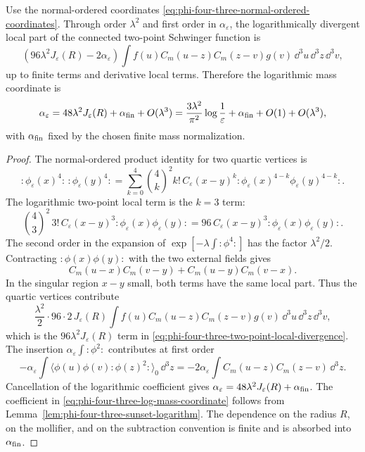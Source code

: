 \begin{lemma}
\label{lem:phi-four-three-two-loop-mass-coordinate}
Use the normal-ordered coordinates
\eqref{eq:phi-four-three-normal-ordered-coordinates}.  Through order
\(\lambda^2\) and first order in \(\alpha_\varepsilon\), the logarithmically
divergent local part of the connected two-point Schwinger function is
\begin{equation}
  \left(96\lambda^2J_\varepsilon(R)-2\alpha_\varepsilon\right)
  \int f(u)C_m(u-z)C_m(z-v)g(v)\,
  \dd^3u\,\dd^3z\,\dd^3v ,
  \label{eq:phi-four-three-two-point-local-divergence}
\end{equation}
up to finite terms and derivative local terms.  Therefore the logarithmic
mass coordinate is
\begin{equation}
  \alpha_\varepsilon
  =
  48\lambda^2J_\varepsilon(R)+\alpha_{\rm fin}+O(\lambda^3)
  =
  \frac{3\lambda^2}{\pi^2}\log\frac1\varepsilon
  +\alpha_{\rm fin}+O(1)+O(\lambda^3),
  \label{eq:phi-four-three-log-mass-coordinate}
\end{equation}
with \(\alpha_{\rm fin}\) fixed by the chosen finite mass normalization.
\end{lemma}

\begin{proof}
The normal-ordered product identity for two quartic vertices is
\begin{equation}
  :\!\phi_\varepsilon(x)^4\!:\,:\!\phi_\varepsilon(y)^4\!:
  =
  \sum_{k=0}^{4}
  \binom{4}{k}^2 k!\,
  C_\varepsilon(x-y)^k
  :\!\phi_\varepsilon(x)^{4-k}
  \phi_\varepsilon(y)^{4-k}\!: .
  \label{eq:phi-four-three-wick-product-two-vertices}
\end{equation}
The logarithmic two-point local term is the \(k=3\) term:
\[
  \binom{4}{3}^2\,3!\,C_\varepsilon(x-y)^3
  :\!\phi_\varepsilon(x)\phi_\varepsilon(y)\!:
  =
  96\,C_\varepsilon(x-y)^3
  :\!\phi_\varepsilon(x)\phi_\varepsilon(y)\!: .
\]
The second order in the expansion of
\(\exp[-\lambda\int:\phi^4:]\) has the factor \(\lambda^2/2\).  Contracting
\(:\!\phi(x)\phi(y)\!:\) with the two external fields gives
\[
  C_m(u-x)C_m(v-y)+C_m(u-y)C_m(v-x).
\]
In the singular region \(x-y\) small, both terms have the same local part.
Thus the quartic vertices contribute
\[
  \frac{\lambda^2}{2}\cdot 96\cdot 2\,J_\varepsilon(R)
  \int f(u)C_m(u-z)C_m(z-v)g(v)\,\dd^3u\,\dd^3z\,\dd^3v ,
\]
which is the \(96\lambda^2J_\varepsilon(R)\) term in
\eqref{eq:phi-four-three-two-point-local-divergence}.  The insertion
\(\alpha_\varepsilon\int:\phi^2:\) contributes at first order
\[
  -\alpha_\varepsilon
  \int \langle\phi(u)\phi(v):\!\phi(z)^2\!:\rangle_0
  \,\dd^3z
  =
  -2\alpha_\varepsilon
  \int C_m(u-z)C_m(z-v)\,\dd^3z .
  \]
Cancellation of the logarithmic coefficient gives
\(\alpha_\varepsilon=48\lambda^2J_\varepsilon(R)+\alpha_{\rm fin}\).  The
coefficient in \eqref{eq:phi-four-three-log-mass-coordinate} follows from
Lemma~\ref{lem:phi-four-three-sunset-logarithm}.  The dependence on the
radius \(R\), on the mollifier, and on the subtraction convention is finite
and is absorbed into \(\alpha_{\rm fin}\).
\end{proof}


